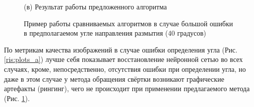 \begin{figure}[H]
\begin{minipage}[t]{0.3\linewidth}
(в) Результат работы предложенного алгоритма\\ 
\end{minipage}
\caption{ Пример работы сравниваемых алгоритмов в случае большой ошибки в предполагаемом угле направления размытия (40 градусов) }
\label{ris:Wrong_angle}
\end{figure}

По метрикам качества изображений в случае ошибки определения угла (Рис. \ref{ris:plots_a}) лучше себя показывает восстановление нейронной сетью во всех случаях, кроме, непосредственно, отсутствия ошибки при определении угла, но даже в этом случае у метода обращения свёртки возникают графические артефакты (рингинг), чего не происходит при применении предлагаемого метода (Рис. \ref{ris:Wrong_angle}).


\begin{figure}[H]
\begin{minipage}[8]{0.45\linewidth}
\\ 
\end{minipage}
    \hfill
\begin{minipage}[8]{0.46\linewidth}

\end{minipage}
\end{figure}
